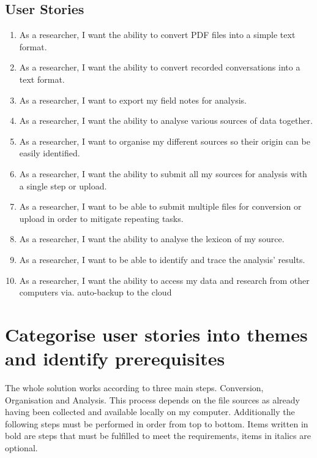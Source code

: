 \documentclass{article}
\begin{document}
\subsection{User Stories}
\begin{enumerate}
    \item As a researcher, I want the ability to convert PDF files into a simple text format.
    
    \item As a researcher, I want the ability to convert recorded conversations into a text format.
    
    \item As a researcher, I want to export my field notes for analysis.
    
    \item As a researcher, I want the ability to analyse various sources of data together.
    
    \item As a researcher, I want to organise my different sources so their origin can be easily identified.
    
    \item As a researcher, I want the ability to submit all my sources for analysis with a single step or upload.
    
    \item As a researcher, I want to be able to submit multiple files for conversion or upload in order to mitigate repeating tasks.
    
    \item As a researcher, I want the ability to analyse the lexicon of my source.
    
    \item As a researcher, I want to be able to identify and trace the analysis' results.
    
    \item As a researcher, I want the ability to access my data and research from other computers via. auto-backup to the cloud
    
\end{enumerate}

\section{Categorise user stories into themes and identify prerequisites}
The whole solution works according to three main steps. Conversion, Organisation and Analysis. This process depends on the file sources as already having been collected and available locally on my computer. Additionally the following steps must be performed in order from top to bottom. Items written in bold are steps that must be fulfilled to meet the requirements, items in italics are optional.
\end{document}
